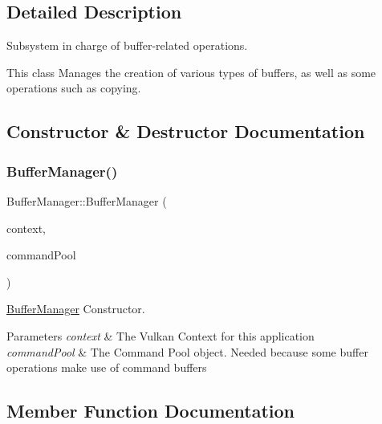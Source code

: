 \subsection{Detailed Description}
Subsystem in charge of buffer-\/related operations. 

This class Manages the creation of various types of buffers, as well as some operations such as copying. 

\subsection{Constructor \& Destructor Documentation}
\mbox{\label{class_buffer_manager_af523fae07b927dafb3f5f3bef5f927ac}} 
\subsubsection{\texorpdfstring{BufferManager()}{BufferManager()}}
{\footnotesize\ttfamily Buffer\+Manager\+::\+Buffer\+Manager (\begin{DoxyParamCaption}\item[{std\+::shared\+\_\+ptr$<$ \mbox{\hyperlink{class_vulkan_context}{Vulkan\+Context}} $>$}]{context,  }\item[{std\+::shared\+\_\+ptr$<$ \mbox{\hyperlink{class_command_pool}{Command\+Pool}} $>$}]{command\+Pool }\end{DoxyParamCaption})}



\mbox{\hyperlink{class_buffer_manager}{Buffer\+Manager}} Constructor. 


\begin{DoxyParams}{Parameters}
{\em context} & The Vulkan Context for this application \\
\hline
{\em command\+Pool} & The Command Pool object. Needed because some buffer operations make use of command buffers \\
\hline
\end{DoxyParams}


\subsection{Member Function Documentation}
\mbox{\label{class_buffer_manager_af126ee94ee4e2a4a0b7cf0d4aa6b0c65}} 
